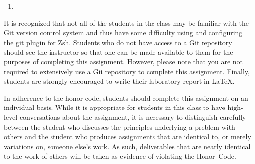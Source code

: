   \begin{enumerate}
    \item 
  \end{enumerate}

  It is recognized that not all of the students in the class may be familiar with the Git version control system and thus have some
  difficulty using and configuring the git plugin for Zsh.  Students who do not have access to a Git repository should see the
  instructor so that one can be made available to them for the purposes of completing this assignment. However, please note that you
  are not required to extensively use a Git repository to complete this assignment. Finally, students are strongly encouraged to
  write their laboratory report in \LaTeX.

  In adherence to the honor code, students should complete this assignment on an individual basis. While it is appropriate for
  students in this class to have high-level conversations about the assignment, it is necessary to distinguish carefully between the
  student who discusses the principles underlying a problem with others and the student who produces assignments that are identical
  to, or merely variations on, someone else's work.  As such, deliverables that are nearly identical to the work of others will be
  taken as evidence of violating the \mbox{Honor Code}.  



  
